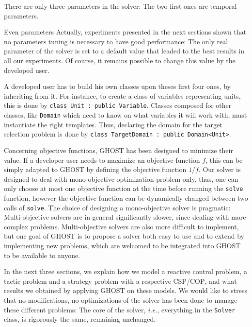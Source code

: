 \documentclass[journal]{IEEEtran}
\newcommand{\csp}{\textsc{CSP}\xspace}
\newcommand{\cop}{\textsc{COP}\xspace}
\newcommand{\ghost}{\textsc{GHOST}\xspace}
\newcommand{\ie}{\textit{i.e.}}
\begin{document}
There are only three parameters in  the solver: The two first ones are
temporal parameters. 


Even parameters Actually, experiments presented in the next sections shown
that no parameters  tuning is necessary to have  good performance: The
only  real parameter  of the  solver is  set to  a default  value that
leaded  to the  best results  in all  our experiments.  Of course,  it
remains possible to change this value by the developed user.


A developed user  has to build his own classes  upon theses first four
ones,  by inheriting  from  it. For  instance, to  create  a class  of
variables     representing     units,      this     is     done     by
\texttt{class~Unit~:~public~Variable}.   Classes  composed  for  other
classes, like \texttt{Domain} which need  to know on what variables it
will work with, must instantiate  the right templates. Thus, declaring
the   domain   for  the   target   selection   problem  is   done   by
\texttt{class~TargetDomain~:~public~Domain<Unit>}.

Concerning objective  functions, \ghost has been  designed to minimize
their  value.  If  a developer  user  needs to  maximize an  objective
function $f$,  this can be  simply adapted  to \ghost by  defining the
objective  function  $1/f$.   Our  solver is  designed  to  deal  with
mono-objective optimization problem only, thus, one can only choose at
most  one   objective  function  at   the  time  before   running  the
\texttt{solve}  function,  however  the   objective  function  can  be
dynamically changed between two calls of \texttt{solve}. The choice of
designing  a  mono-objective   solver  is  pragmatic:  Multi-objective
solvers are in  general significantly slower, since  dealing with more
complex problems.  Multi-objective solvers  are also more difficult to
implement, but one goal of \ghost is  to propose a solver both easy to
use and to extend by implementing  new problems, which are welcomed to
be integrated into \ghost to be available to anyone.

In the next three sections, we explain how we model a reactive control
problem, a  tactic problem  and a strategy  problem with  a respective
\csp/\cop, and  what results we  obtained by applying \ghost  on these
models.   We   would  like  to   stress  that  no   modifications,  no
optimizations of  the solver has  been done to manage  these different
problems:   The  core   of  the   solver,  \ie,   everything  in   the
\texttt{Solver}   class,    is   rigorously   the    same,   remaining
unchanged. 
\end{document}
